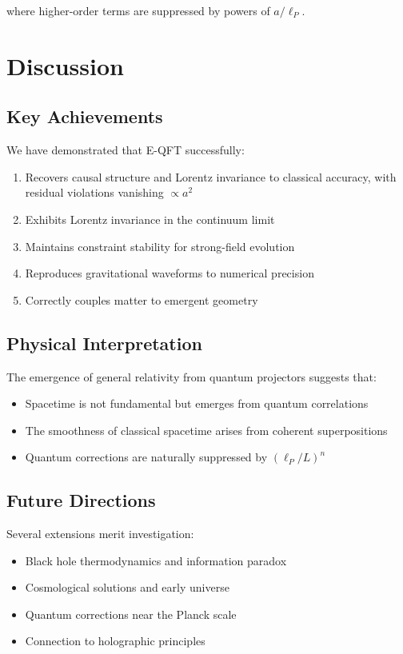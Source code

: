 \documentclass[11pt,a4paper]{article}
\begin{document}
where higher-order terms are suppressed by powers of $a/\ell_P$.

\section{Discussion}

\subsection{Key Achievements}

We have demonstrated that E-QFT successfully:
\begin{enumerate}
\item Recovers causal structure and Lorentz invariance to classical accuracy, with residual violations vanishing $\propto a^2$
\item Exhibits Lorentz invariance in the continuum limit
\item Maintains constraint stability for strong-field evolution
\item Reproduces gravitational waveforms to numerical precision
\item Correctly couples matter to emergent geometry
\end{enumerate}

\subsection{Physical Interpretation}

The emergence of general relativity from quantum projectors suggests that:
\begin{itemize}
\item Spacetime is not fundamental but emerges from quantum correlations
\item The smoothness of classical spacetime arises from coherent superpositions
\item Quantum corrections are naturally suppressed by $(\ell_P/L)^n$
\end{itemize}

\subsection{Future Directions}

Several extensions merit investigation:
\begin{itemize}
\item Black hole thermodynamics and information paradox
\item Cosmological solutions and early universe
\item Quantum corrections near the Planck scale
\item Connection to holographic principles
\end{itemize}
\end{document}
